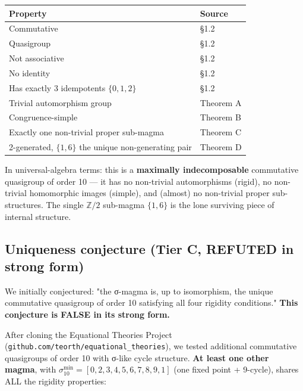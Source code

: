 \documentclass[11pt,reqno]{amsart}
\theoremstyle{plain}
\theoremstyle{definition}
\begin{document}
\begin{center}
\begin{tabular}{ll}
\toprule
Property & Source \\
\midrule
Commutative & §1.2 \\
Quasigroup & §1.2 \\
Not associative & §1.2 \\
No identity & §1.2 \\
Has exactly 3 idempotents $\{0, 1, 2\}$ & §1.2 \\
Trivial automorphism group & Theorem A \\
Congruence-simple & Theorem B \\
Exactly one non-trivial proper sub-magma & Theorem C \\
2-generated, $\{1, 6\}$ the unique non-generating pair & Theorem D \\
\bottomrule
\end{tabular}
\end{center}

In universal-algebra terms: this is a \textbf{maximally indecomposable} commutative quasigroup of order 10 --- it has no non-trivial automorphisms (rigid), no non-trivial homomorphic images (simple), and (almost) no non-trivial proper sub-structures. The single $\mathbb{Z}/2$ sub-magma $\{1, 6\}$ is the lone surviving piece of internal structure.

\subsection{Uniqueness conjecture (Tier C, REFUTED in strong form)}

We initially conjectured: "the σ-magma is, up to isomorphism, the unique commutative quasigroup of order 10 satisfying all four rigidity conditions." \textbf{This conjecture is FALSE in its strong form.}

After cloning the Equational Theories Project (\texttt{github.com/teorth/equational_theories}), we tested additional commutative quasigroups of order 10 with σ-like cycle structure. \textbf{At least one other magma}, with $\sigma_{10}^{\min} = [0, 2, 3, 4, 5, 6, 7, 8, 9, 1]$ (one fixed point + 9-cycle), shares ALL the rigidity properties:
\end{document}
